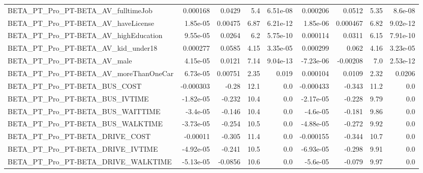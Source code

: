 \begin{tabular}{lrrrrrrrr}
BETA\_PT\_Pro\_PT-BETA\_AV\_fulltimeJob                 &    0.000168 &       0.0429 &      5.4 & 6.51e-08 &   0.000206 &      0.0512 &         5.35 &       8.6e-08 \\
BETA\_PT\_Pro\_PT-BETA\_AV\_haveLicense                 &    1.85e-05 &      0.00475 &     6.87 & 6.21e-12 &   1.85e-06 &    0.000467 &         6.82 &      9.02e-12 \\
BETA\_PT\_Pro\_PT-BETA\_AV\_highEducation               &    9.55e-05 &       0.0264 &      6.2 & 5.75e-10 &   0.000114 &      0.0311 &         6.15 &      7.91e-10 \\
BETA\_PT\_Pro\_PT-BETA\_AV\_kid\_under18                 &    0.000277 &       0.0585 &     4.15 & 3.35e-05 &   0.000299 &       0.062 &         4.16 &      3.23e-05 \\
BETA\_PT\_Pro\_PT-BETA\_AV\_male                        &    4.15e-05 &       0.0121 &     7.14 & 9.04e-13 &  -7.23e-06 &    -0.00208 &          7.0 &      2.53e-12 \\
BETA\_PT\_Pro\_PT-BETA\_AV\_moreThanOneCar              &    6.73e-05 &      0.00751 &     2.35 &    0.019 &   0.000104 &      0.0109 &         2.32 &        0.0206 \\
BETA\_PT\_Pro\_PT-BETA\_BUS\_COST                       &   -0.000303 &        -0.28 &     12.1 &      0.0 &  -0.000433 &      -0.343 &         11.2 &           0.0 \\
BETA\_PT\_Pro\_PT-BETA\_BUS\_IVTIME                     &   -1.82e-05 &       -0.232 &     10.4 &      0.0 &  -2.17e-05 &      -0.228 &         9.79 &           0.0 \\
BETA\_PT\_Pro\_PT-BETA\_BUS\_WAITTIME                   &    -3.4e-05 &       -0.146 &     10.4 &      0.0 &   -4.6e-05 &      -0.181 &         9.86 &           0.0 \\
BETA\_PT\_Pro\_PT-BETA\_BUS\_WALKTIME                   &   -3.73e-05 &       -0.254 &     10.5 &      0.0 &  -4.88e-05 &      -0.272 &         9.92 &           0.0 \\
BETA\_PT\_Pro\_PT-BETA\_DRIVE\_COST                     &    -0.00011 &       -0.305 &     11.4 &      0.0 &  -0.000155 &      -0.344 &         10.7 &           0.0 \\
BETA\_PT\_Pro\_PT-BETA\_DRIVE\_IVTIME                   &   -4.92e-05 &       -0.241 &     10.5 &      0.0 &  -6.93e-05 &      -0.298 &         9.91 &           0.0 \\
BETA\_PT\_Pro\_PT-BETA\_DRIVE\_WALKTIME                 &   -5.13e-05 &      -0.0856 &     10.6 &      0.0 &   -5.6e-05 &      -0.079 &         9.97 &           0.0 \\

\end{tabular}

